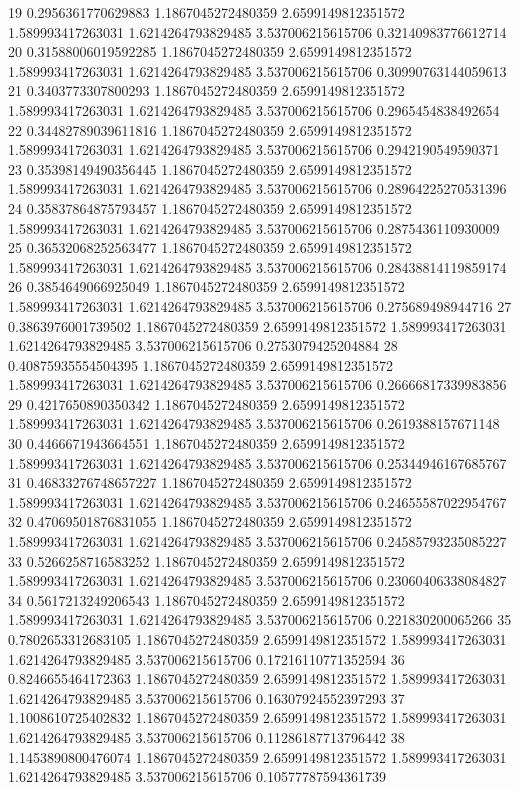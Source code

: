 {19 0.2956361770629883 1.1867045272480359 2.6599149812351572 1.589993417263031 1.6214264793829485 3.537006215615706 0.32140983776612714
20 0.31588006019592285 1.1867045272480359 2.6599149812351572 1.589993417263031 1.6214264793829485 3.537006215615706 0.30990763144059613
21 0.3403773307800293 1.1867045272480359 2.6599149812351572 1.589993417263031 1.6214264793829485 3.537006215615706 0.2965454838492654
22 0.34482789039611816 1.1867045272480359 2.6599149812351572 1.589993417263031 1.6214264793829485 3.537006215615706 0.2942190549590371
23 0.35398149490356445 1.1867045272480359 2.6599149812351572 1.589993417263031 1.6214264793829485 3.537006215615706 0.28964225270531396
24 0.35837864875793457 1.1867045272480359 2.6599149812351572 1.589993417263031 1.6214264793829485 3.537006215615706 0.2875436110930009
25 0.36532068252563477 1.1867045272480359 2.6599149812351572 1.589993417263031 1.6214264793829485 3.537006215615706 0.28438814119859174
26 0.3854649066925049 1.1867045272480359 2.6599149812351572 1.589993417263031 1.6214264793829485 3.537006215615706 0.275689498944716
27 0.3863976001739502 1.1867045272480359 2.6599149812351572 1.589993417263031 1.6214264793829485 3.537006215615706 0.2753079425204884
28 0.40875935554504395 1.1867045272480359 2.6599149812351572 1.589993417263031 1.6214264793829485 3.537006215615706 0.26666817339983856
29 0.4217650890350342 1.1867045272480359 2.6599149812351572 1.589993417263031 1.6214264793829485 3.537006215615706 0.2619388157671148
30 0.4466671943664551 1.1867045272480359 2.6599149812351572 1.589993417263031 1.6214264793829485 3.537006215615706 0.25344946167685767
31 0.46833276748657227 1.1867045272480359 2.6599149812351572 1.589993417263031 1.6214264793829485 3.537006215615706 0.24655587022954767
32 0.47069501876831055 1.1867045272480359 2.6599149812351572 1.589993417263031 1.6214264793829485 3.537006215615706 0.24585793235085227
33 0.5266258716583252 1.1867045272480359 2.6599149812351572 1.589993417263031 1.6214264793829485 3.537006215615706 0.23060406338084827
34 0.5617213249206543 1.1867045272480359 2.6599149812351572 1.589993417263031 1.6214264793829485 3.537006215615706 0.221830200065266
35 0.7802653312683105 1.1867045272480359 2.6599149812351572 1.589993417263031 1.6214264793829485 3.537006215615706 0.17216110771352594
36 0.8246655464172363 1.1867045272480359 2.6599149812351572 1.589993417263031 1.6214264793829485 3.537006215615706 0.16307924552397293
37 1.1008610725402832 1.1867045272480359 2.6599149812351572 1.589993417263031 1.6214264793829485 3.537006215615706 0.11286187713796442
38 1.1453890800476074 1.1867045272480359 2.6599149812351572 1.589993417263031 1.6214264793829485 3.537006215615706 0.10577787594361739
}
